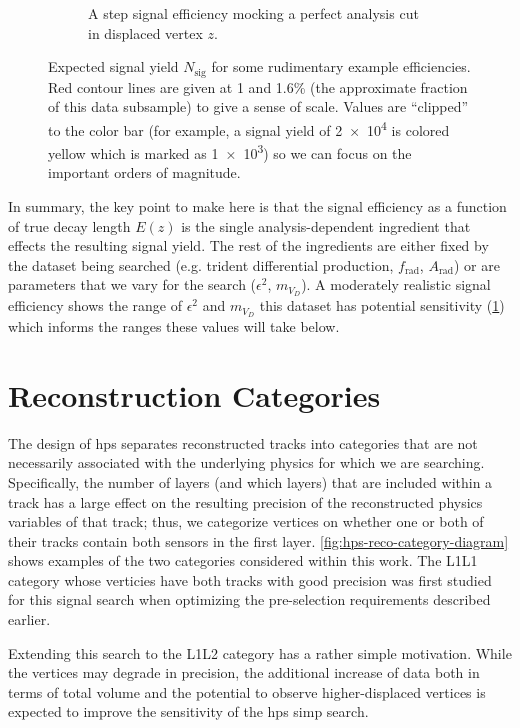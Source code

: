 \begin{figure}
\begin{subfigure}{0.48\textwidth}
    \caption{A step signal efficiency mocking a perfect analysis cut in displaced vertex $z$.}
    \label{fig:n-sig-eg:step}
  \end{subfigure}
  \caption{Expected signal yield $N_\mathrm{sig}$ for some rudimentary example efficiencies.
  Red contour lines are given at 1 and 1.6\% (the approximate fraction of this data subsample)
  to give a sense of scale.
  Values are ``clipped'' to the color bar (for example, a signal yield of \num{2e4} is colored
  yellow which is marked as \num{1e3}) so we can focus on the important orders of magnitude.}
  \label{fig:n-sig-eg}
\end{figure}

In summary, the key point to make here is that the signal efficiency as a function of true
decay length $E(z)$ is the single analysis-dependent ingredient that effects the resulting
signal yield.
The rest of the ingredients are either fixed by the dataset being searched (e.g. trident
differential production, $f_\mathrm{rad}$, $A_\mathrm{rad}$) or are parameters that we
vary for the search ($\epsilon^2$, $m_{V_D}$).
A moderately realistic signal efficiency shows the range of $\epsilon^2$ and $m_{V_D}$
this dataset has potential sensitivity (\cref{fig:n-sig-eg:step}) which informs the
ranges these values will take below.


\section{Reconstruction Categories}
The design of \ac{hps} separates reconstructed tracks into categories that are
not necessarily associated with the underlying physics for which we are searching.
Specifically, the number of layers (and which layers) that are included within a track
has a large effect on the resulting precision of the reconstructed physics variables
of that track; thus, we categorize vertices on whether one or both of their tracks contain
both sensors in the first layer.
\cref{fig:hps-reco-category-diagram} shows examples of the two categories considered
within this work.
The L1L1 category whose verticies have both tracks with good precision was first studied
for this signal search  when optimizing the pre-selection
requirements described earlier.

Extending this search to the L1L2 category has a rather simple motivation.
While the vertices may degrade in precision, the additional increase of data both in terms
of total volume and the potential to observe higher-displaced vertices is expected to improve
the sensitivity of the \ac{hps} \ac{simp} search.

